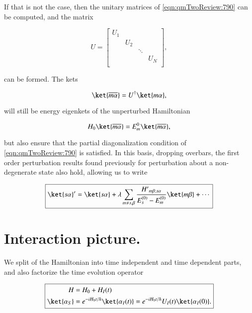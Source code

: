 If that is not the case, then the unitary matrices of \ref{eqn:qmTwoReview:790} can be computed, and the matrix

\begin{equation}\label{eqn:qmTwoReview:230}
U = 
\begin{bmatrix}
U_1 &   	&  	 & \\
    & U_2 	&  	 & \\
    &     	& \ddots & \\
    &     	&        & U_N \\
\end{bmatrix},
\end{equation}

can be formed.  The kets

\begin{equation}\label{eqn:qmTwoReview:850}
\ket{\overline{m \alpha}} = U^\dagger \ket{m \alpha},
\end{equation}

will still be energy eigenkets of the unperturbed Hamiltonian

\begin{equation}\label{eqn:qmTwoReview:870}
H_0 \ket{\overline{m \alpha}} = E_m^0 \ket{\overline{m \alpha}},
\end{equation}

but also ensure that the partial diagonalization condition of \ref{eqn:qmTwoReview:790} is satisfied.  In this basis, dropping overbars, the first order perturbation results found previously for perturbation about a non-degenerate state also hold, allowing us to write

\begin{equation}\label{eqn:qmTwoReview:830}
\boxed{
\ket{s \alpha}' = \ket{s \alpha} 
+ \lambda \sum_{m \ne s, \beta} \frac{{H'}_{m \beta ; s \alpha}}{ E_s^{(0)} - E_m^{(0)} } \ket{m \beta}
+ \cdots
}
\end{equation}

\section{Interaction picture.}

We split of the Hamiltonian into time independent and time dependent parts, and also factorize the time evolution operator

\begin{equation}\label{eqn:qmTwoReview:390}
\boxed{
\begin{aligned}
H &= H_0 + H_I(t) \\
\ket{\alpha_S} &= e^{-i H_0 t/\hbar } \ket{\alpha_I(t)} = e^{-i H_0 t/\hbar } U_I(t) \ket{\alpha_I(0)} .
\end{aligned}
}
\end{equation}

